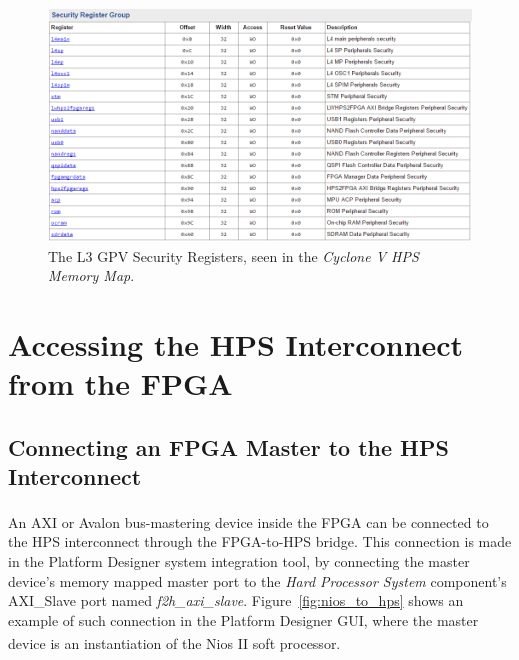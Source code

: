 \documentclass[11pt, twoside, pdftex]{article}
\begin{document}
\begin{figure} [H]
\begin{center}
\includegraphics[scale = 0.6]{figures/fig_securityregisters.png}
\end{center}
\caption{The L3 GPV Security Registers, seen in the \textit{Cyclone V HPS Memory Map}.}
\label{fig:securityregs}
\end{figure}


\section{Accessing the HPS Interconnect from the FPGA}

\subsection{Connecting an FPGA Master to the HPS Interconnect}

An AXI or Avalon\textsuperscript{\textregistered} bus-mastering device inside the FPGA can be connected to the HPS interconnect through the FPGA-to-HPS bridge. This connection is
made in the Platform Designer system integration tool, by connecting the master device's memory mapped master port to the \textit{Hard Processor System} component's
AXI\_Slave port named \textit{f2h\_axi\_slave}. Figure~\ref{fig:nios_to_hps} shows an example of such connection in the Platform Designer GUI, where the master device is an instantiation of the Nios\textsuperscript{\textregistered} II soft processor. 
\end{document}

